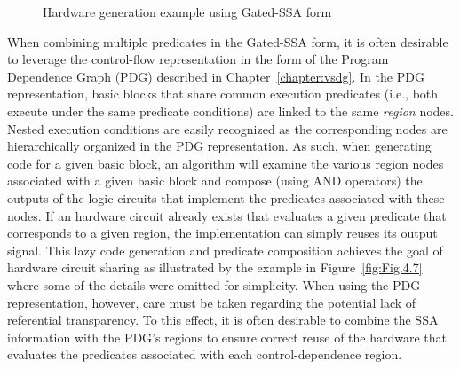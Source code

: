 \begin{figure}[htbp]
  \centering
  \hfill
\caption{Hardware generation example using Gated-SSA form}
\label{fig:Fig.4.6}
\end{figure}
When combining multiple predicates in the Gated-SSA form, it is often desirable to leverage the control-flow representation in the form of the Program Dependence Graph (PDG) described in Chapter~\ref{chapter:vsdg}. 
In the PDG representation, basic blocks that share common execution predicates (i.e., both execute under the same predicate conditions) are linked to the same {\em region} nodes. 
Nested execution conditions are easily recognized as the corresponding nodes are hierarchically organized in the PDG representation. 
As such, when generating code for a given basic block, an algorithm will examine the various region nodes associated with a given basic block and compose (using AND operators) the outputs of the logic circuits that implement the predicates associated with these nodes. 
If an hardware circuit already exists that evaluates a given predicate that corresponds to a given region, the implementation can simply reuses its output signal.  
This lazy code generation and predicate composition achieves the goal of hardware circuit sharing as illustrated by the example in Figure~\ref{fig:Fig.4.7} where some of the details were omitted for simplicity.
When using the PDG representation, however, care must be taken regarding the potential lack of referential transparency. To this effect, it is often desirable to combine the SSA information with the PDG's regions to ensure correct reuse of the hardware that evaluates the predicates associated with each control-dependence region.

